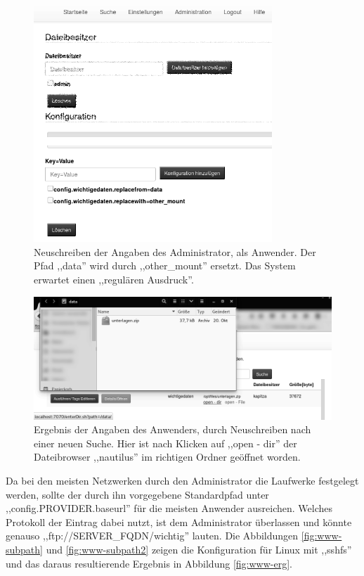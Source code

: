 \documentclass[oneside, ngerman, toc=bibliography,bibliography=totoc,listof=entryprefix, open=right,numbers=noenddot,fontsize=12pt]{scrbook}
\begin{document}
\begin{figure}[htbp] 
    \centering
    \includegraphics[width=0.8\textwidth]{Masterarbeit_Bilder/user_rewrite_other_mount.png}
    \caption{Neuschreiben der Angaben des Administrator, als Anwender. Der Pfad ,,data'' wird durch ,,other\_mount'' ersetzt. Das System erwartet einen ,,regulären Ausdruck''. }
    \label{fig:www-subpath3}
\end{figure}  

\begin{figure}[htbp] 
    \centering
    \includegraphics[width=\textwidth]{Masterarbeit_Bilder/open_mount_dir.png}
    \caption{Ergebnis der Angaben des Anwenders, durch Neuschreiben nach einer neuen Suche. Hier ist nach Klicken auf ,,open - dir'' der Dateibrowser ,,nautilus'' im richtigen Ordner geöffnet worden.}
    \label{fig:www-erg2}
\end{figure}  




Da bei den meisten Netzwerken durch den Administrator die Laufwerke festgelegt werden, sollte der durch ihn vorgegebene Standardpfad unter ,,config.{PROVIDER}.baseurl'' für die meisten Anwender ausreichen. Welches Protokoll der Eintrag dabei nutzt, ist dem Administrator überlassen und könnte genauso ,,ftp://SERVER\_FQDN/wichtig'' lauten.
Die Abbildungen \ref{fig:www-subpath} und \ref{fig:www-subpath2} zeigen die Konfiguration für Linux mit ,,sshfs'' und das daraus resultierende Ergebnis in Abbildung \ref{fig:www-erg}.
\end{document}
